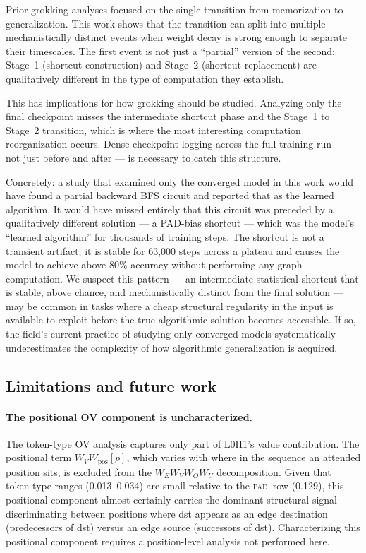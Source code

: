 \documentclass[11pt, a4paper]{article}
\newcommand{\PAD}{\textsc{pad}}
\begin{document}
Prior grokking analyses focused on the single transition from
memorization to generalization.  This work shows that the transition
can split into multiple mechanistically distinct events when weight
decay is strong enough to separate their timescales.  The first event
is not just a ``partial'' version of the second: Stage~1 (shortcut
construction) and Stage~2 (shortcut replacement) are qualitatively
different in the type of computation they establish.

This has implications for how grokking should be studied.  Analyzing
only the final checkpoint misses the intermediate shortcut phase and
the Stage~1 to Stage~2 transition, which is where the most interesting
computation reorganization occurs.  Dense checkpoint logging across the
full training run --- not just before and after --- is necessary to
catch this structure.

Concretely: a study that examined only the converged model in this work
would have found a partial backward BFS circuit and reported that as the
learned algorithm.  It would have missed entirely that this circuit was
preceded by a qualitatively different solution --- a PAD-bias shortcut
--- which was the model's ``learned algorithm'' for thousands of
training steps.  The shortcut is not a transient artifact; it is stable
for 63{,}000 steps across a plateau and causes the model to achieve
above-80\% accuracy without performing any graph computation.  We
suspect this pattern --- an intermediate statistical shortcut that is
stable, above chance, and mechanistically distinct from the final
solution --- may be common in tasks where a cheap structural regularity
in the input is available to exploit before the true algorithmic
solution becomes accessible.  If so, the field's current practice of
studying only converged models systematically underestimates the
complexity of how algorithmic generalization is acquired.

\subsection{Limitations and future work}

\paragraph{The positional OV component is uncharacterized.}
The token-type OV analysis captures only part of L0H1's value
contribution.  The positional term $W_V W_{\mathrm{pos}}[p]$, which
varies with where in the sequence an attended position sits, is
excluded from the $W_E W_V W_O W_U$ decomposition.  Given that
token-type ranges (0.013--0.034) are small relative to the \PAD\ row
(0.129), this positional component almost certainly carries the
dominant structural signal --- discriminating between positions where
dst appears as an edge destination (predecessors of dst) versus an
edge source (successors of dst).  Characterizing this positional
component requires a position-level analysis not performed here.
\end{document}
